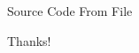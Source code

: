\documentclass[hyperref, UTF8, CJK]{beamer}
\begin{document}
\begin{frame}[fragile]{Source Code From File}
\end{frame}


\begin{frame}
	\centering
	\Huge Thanks!
\end{frame}
\end{document}
